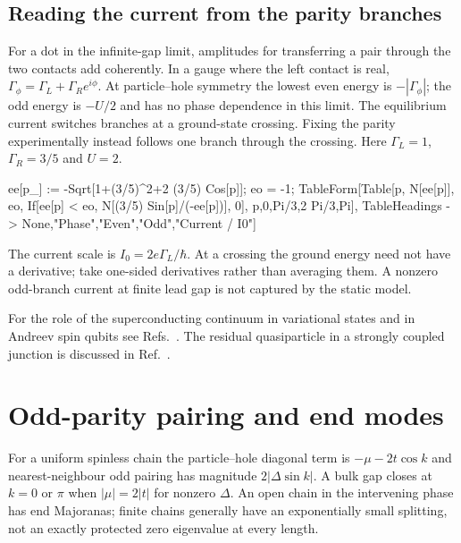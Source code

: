 \subsection{Reading the current from the parity branches}
For a dot in the infinite-gap limit, amplitudes for transferring a
pair through the two contacts add coherently. In a gauge where the
left contact is real, $\Gamma_\phi=\Gamma_L+\Gamma_R e^{i\phi}$.
At particle--hole symmetry the lowest even energy is $-|\Gamma_\phi|$;
the odd energy is $-U/2$ and has no phase dependence in this limit.
The equilibrium current switches branches at a ground-state crossing.
Fixing the parity experimentally instead follows one branch through
the crossing. Here $\Gamma_L=1$, $\Gamma_R=3/5$ and $U=2$.
\begin{wl}
ee[p_] := -Sqrt[1+(3/5)^2+2 (3/5) Cos[p]];
eo = -1;
TableForm[Table[{p, N[ee[p]], eo,
  If[ee[p] < eo, N[(3/5) Sin[p]/(-ee[p])], 0]}, {p,{0,Pi/3,2 Pi/3,Pi}}],
 TableHeadings -> {None,{"Phase","Even","Odd","Current / I0"}}]
\end{wl}
The current scale is $I_0=2e\Gamma_L/\hbar$. At a crossing the
ground energy need not have a derivative; take one-sided derivatives
rather than averaging them. A nonzero odd-branch current at finite
lead gap is not captured by the static model.
\begin{furtherreading}
For the role of the superconducting continuum in variational states
and in Andreev spin qubits see Refs.~\cite{ilicin-variational,ilicin-qubit}.
The residual quasiparticle in a strongly coupled junction is discussed
in Ref.~\cite{pavesic-residual}.
\end{furtherreading}

\section{Odd-parity pairing and end modes}
For a uniform spinless chain the particle--hole diagonal term is
$-\mu-2t\cos k$ and nearest-neighbour odd pairing has magnitude
$2|\Delta\sin k|$. A bulk gap closes at $k=0$ or $\pi$ when
$|\mu|=2|t|$ for nonzero $\Delta$. An open chain in the intervening
phase has end Majoranas; finite chains generally have an exponentially
small splitting, not an exactly protected zero eigenvalue at every
length.

